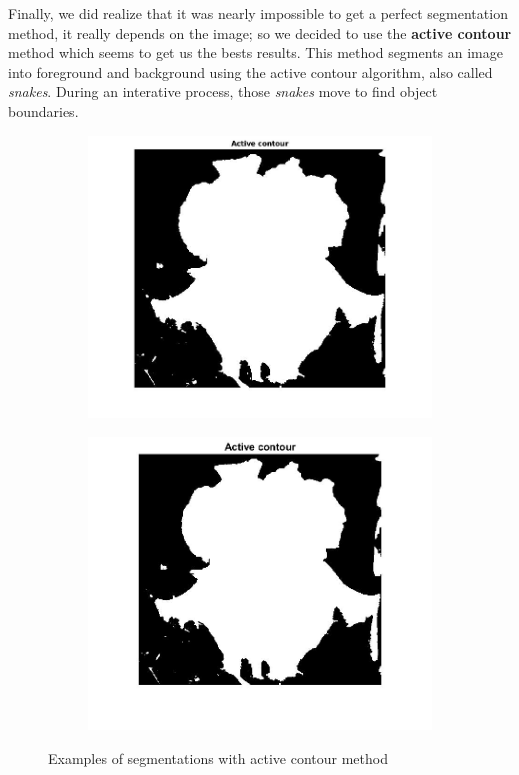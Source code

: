 \documentclass[11]{article}
\begin{document}
Finally, we did realize that it was nearly impossible to get a perfect segmentation method, it really depends on the image; so we decided to use the \textbf{active contour} method which seems to get us the bests results. This method segments an image into foreground and background using the active contour algorithm, also called \textit{snakes}. During an interative process, those \textit{snakes} move to find object boundaries.

\begin{figure}[H]
    \begin{subfigure}[t]{0.45\textwidth}
    \centering
  \includegraphics[scale=0.20]{images/segmentation4.jpg}
    \end{subfigure}
    \begin{subfigure}[t]{0.45\textwidth}
    \centering
    \includegraphics[scale=0.20]{images/segmentation3.jpg}
    \end{subfigure}
    \label{segmentation4}
    \caption{Examples of segmentations with active contour method}
\end{figure}
\end{document}
